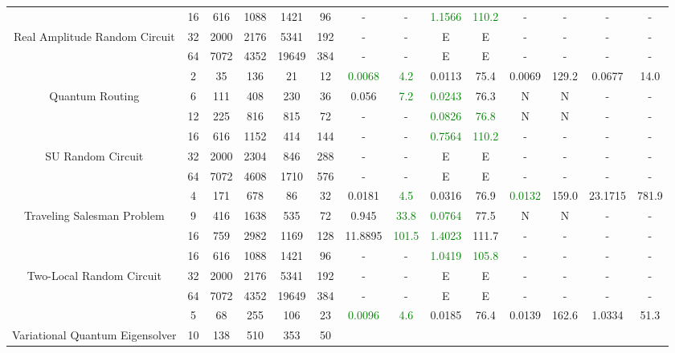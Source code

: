 \begin{table}[htb]
{\begin{tabular}{|c|c|c|c|c|c|c|c|c|c|c|c|c|c|}
 \\
\hline
 & 
16 & 616 & 1088 & 1421 & 96
 & - & -
 & \textcolor{green}{1.1566} & \textcolor{green}{110.2}
 & - & -
 & - & -
 \\
Real Amplitude Random Circuit & 
32 & 2000 & 2176 & 5341 & 192
 & - & -
 & E & E
 & - & -
 & - & -
 \\
 & 
64 & 7072 & 4352 & 19649 & 384
 & - & -
 & E & E
 & - & -
 & - & -
 \\
\hline
 & 
2 & 35 & 136 & 21 & 12
 & \textcolor{green}{0.0068} & \textcolor{green}{4.2}
 & 0.0113 & 75.4
 & 0.0069 & 129.2
 & 0.0677 & 14.0
 \\
Quantum Routing & 
6 & 111 & 408 & 230 & 36
 & 0.056 & \textcolor{green}{7.2}
 & \textcolor{green}{0.0243} & 76.3
 & N & N 
 & - & -
 \\
 & 
12 & 225 & 816 & 815 & 72
 & - & -
 & \textcolor{green}{0.0826} & \textcolor{green}{76.8}
 & N & N 
 & - & -
 \\
\hline
 & 
16 & 616 & 1152 & 414 & 144
 & - & -
 & \textcolor{green}{0.7564} & \textcolor{green}{110.2}
 & - & -
 & - & -
 \\
SU Random Circuit & 
32 & 2000 & 2304 & 846 & 288
 & - & -
 & E & E
 & - & -
 & - & -
 \\
 & 
64 & 7072 & 4608 & 1710 & 576
 & - & -
 & E & E
 & - & -
 & - & -
 \\
\hline
 & 
4 & 171 & 678 & 86 & 32
 & 0.0181 & \textcolor{green}{4.5}
 & 0.0316 & 76.9
 & \textcolor{green}{0.0132} & 159.0
 & 23.1715 & 781.9
 \\
Traveling Salesman Problem & 
9 & 416 & 1638 & 535 & 72
 & 0.945 & \textcolor{green}{33.8}
 & \textcolor{green}{0.0764} & 77.5
 & N & N 
 & - & -
 \\
 & 
16 & 759 & 2982 & 1169 & 128
 & 11.8895 & \textcolor{green}{101.5}
 & \textcolor{green}{1.4023} & 111.7
 & - & -
 & - & -
 \\
\hline
 & 
16 & 616 & 1088 & 1421 & 96
 & - & -
 & \textcolor{green}{1.0419} & \textcolor{green}{105.8}
 & - & -
 & - & -
 \\
Two-Local Random Circuit & 
32 & 2000 & 2176 & 5341 & 192
 & - & -
 & E & E
 & - & -
 & - & -
 \\
 & 
64 & 7072 & 4352 & 19649 & 384
 & - & -
 & E & E
 & - & -
 & - & -
 \\
\hline
 & 
5 & 68 & 255 & 106 & 23
 & \textcolor{green}{0.0096} & \textcolor{green}{4.6}
 & 0.0185 & 76.4
 & 0.0139 & 162.6
 & 1.0334 & 51.3
 \\
Variational Quantum Eigensolver & 
10 & 138 & 510 & 353 & 50

\end{tabular}}
\end{table}
